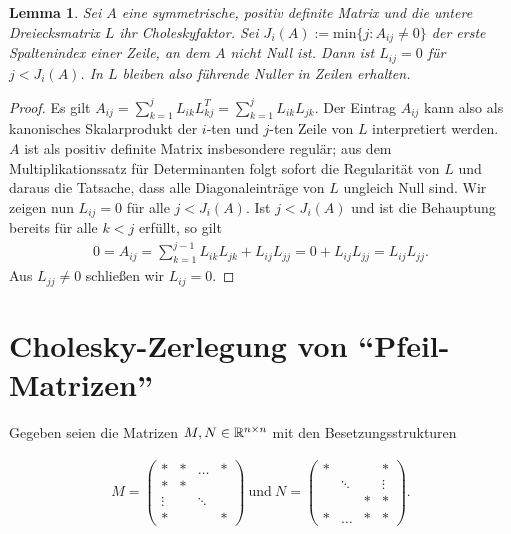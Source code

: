 \documentclass{article}
\newtheorem*{lemma}{Lemma}
\begin{document}
\begin{lemma}
Sei $A$ eine symmetrische, positiv definite Matrix und die untere Dreiecksmatrix $L$ ihr Choleskyfaktor. Sei $J_i(A) := \mathrm{min}\{ j: A_{ij} \neq 0 \}$ der erste Spaltenindex einer Zeile, an dem $A$ nicht Null ist. Dann ist $L_{ij} = 0$ für $j < J_i(A)$. In $L$ bleiben also führende Nuller in Zeilen erhalten.
\end{lemma}
 
\begin{proof}
Es gilt $A_{ij} = \sum_{k=1}^j L_{ik} L_{kj}^T
= \sum_{k=1}^j L_{ik} L_{jk}$. Der Eintrag $A_{ij}$ kann also als kanonisches Skalarprodukt der $i$-ten und $j$-ten Zeile von $L$ interpretiert werden. $A$ ist als positiv definite Matrix insbesondere regulär; aus dem Multiplikationssatz für Determinanten folgt sofort die Regularität von $L$ und daraus die Tatsache, dass alle Diagonaleinträge von $L$ ungleich Null sind. Wir zeigen nun $L_{ij} = 0$ für alle $j < J_i(A)$.
Ist $j < J_i(A)$ und ist die Behauptung bereits für alle $k < j$ erfüllt, so gilt
\begin{align*}
0 = A_{ij} = \sum_{k=1}^{j-1} L_{ik} L_{jk} + L_{ij} L_{jj} = 0 + L_{ij} L_{jj} = L_{ij} L_{jj}.
\end{align*}
Aus $L_{jj} \neq 0$ schließen wir $L_{ij} = 0$.
\end{proof}

\section{Cholesky-Zerlegung von "`Pfeil-Matrizen"'}

Gegeben seien die Matrizen $M,N \in \mathbb{R}^{n \times n}$ mit den Besetzungsstrukturen

\begin{align*}
    M =
\left(\begin{array}{cccccc}                                
                \ast & \ast & \hdots & \ast \\
                \ast & \ast && \\
                \vdots && \ddots & \\
                \ast &&& \ast
      \end{array}
\right)   
\mathrm{~und~} 
    N =
\left(\begin{array}{cccccc}                                
                \ast &&& \ast \\
                & \ddots && \vdots \\
                && \ast & \ast \\
                \ast & \hdots & \ast & \ast 
      \end{array}
\right). 
\end{align*}
\end{document}
